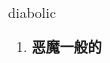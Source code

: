 
\begin{frame}
{\huge diabolic}
\begin{center}
\begin{enumerate}\Large
  \item \textbf{恶魔一般的}
\end{enumerate}
\end{center}
\end{frame}
